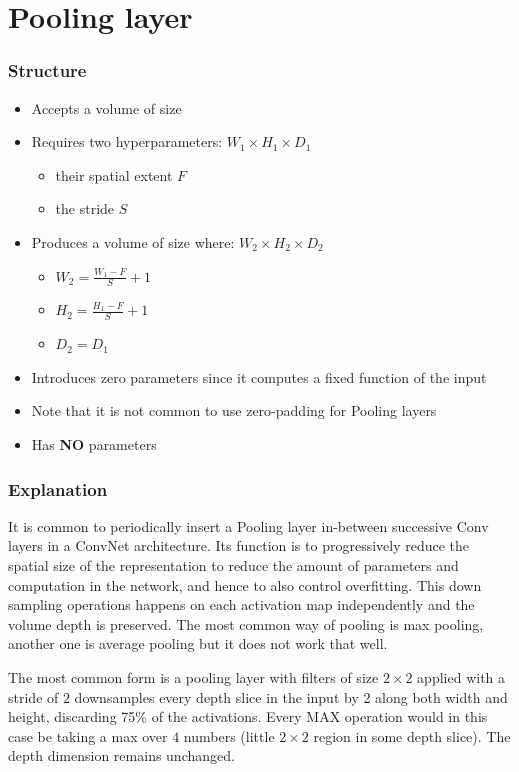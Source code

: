 \chapter{Pooling layer}

\subsection*{Structure}

\begin{itemize}
\item Accepts a volume of size

\item Requires two hyperparameters: $W_1 \times H_1 \times D_1$
\begin{itemize}
    \item their spatial extent $F$
    \item the stride $S$
\end{itemize}
\item Produces a volume of size  where: $W_2 \times H_2 \times D_2$
\begin{itemize}
\item $W_2 = \frac{W_1-F}{S}+1$
\item $H_2 = \frac{H_1-F}{S}+1$
\item $D_2 = D_1$
\end{itemize}
\item Introduces zero parameters since it computes a fixed function of the input
\item Note that it is not common to use zero-padding for Pooling layers
\item Has \textbf{NO} parameters
\end{itemize}

\subsection*{Explanation}
It is common to periodically insert a Pooling layer in-between successive Conv layers in a ConvNet architecture. Its function is to progressively reduce the spatial size of the representation to reduce the amount of parameters and computation in the network, and hence to also control overfitting.  This down sampling operations happens on each activation map independently and the volume depth is preserved. The most common way of pooling is max pooling, another one is average pooling but it does not work that well.

The most common form is a pooling layer with filters of size $2 \times 2$ applied with a stride of $2$ downsamples every depth slice in the input by 2 along both width and height, discarding 75\% of the activations. Every MAX operation would in this case be taking a max over $4$ numbers (little $2 \times 2$ region in some depth slice). The depth dimension remains unchanged.

